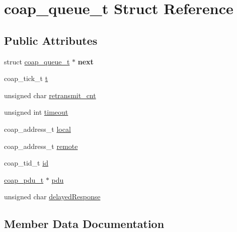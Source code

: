 \hypertarget{structcoap__queue__t}{}\section{coap\+\_\+queue\+\_\+t Struct Reference}
\label{structcoap__queue__t}
\subsection*{Public Attributes}
\begin{DoxyCompactItemize}
\item 
\hypertarget{structcoap__queue__t_a75428f649543d0779fce28c8538247d6}{}struct \hyperlink{structcoap__queue__t}{coap\+\_\+queue\+\_\+t} $\ast$ {\bfseries next}\label{structcoap__queue__t_a75428f649543d0779fce28c8538247d6}

\item 
coap\+\_\+tick\+\_\+t \hyperlink{structcoap__queue__t_ab5edd7b3b3ddd98d8356febbd4726e7c}{t}
\item 
unsigned char \hyperlink{structcoap__queue__t_aff24f5a43b3d2182535bc7bd2b5f5341}{retransmit\+\_\+cnt}
\item 
unsigned int \hyperlink{structcoap__queue__t_a4d8b47a02fea39b9a9fc0501f81cbaa2}{timeout}
\item 
coap\+\_\+address\+\_\+t \hyperlink{structcoap__queue__t_a19d2b774c366900ac9b34869cec54ec5}{local}
\item 
coap\+\_\+address\+\_\+t \hyperlink{structcoap__queue__t_a15ba08baabdadfe7ec9179e7dba5b5f2}{remote}
\item 
coap\+\_\+tid\+\_\+t \hyperlink{structcoap__queue__t_aeded9dd536f54ee47418575711e7dbac}{id}
\item 
\hyperlink{structcoap__pdu__t}{coap\+\_\+pdu\+\_\+t} $\ast$ \hyperlink{structcoap__queue__t_a2bc9a6e3ed0442653e53b92f5fa92954}{pdu}
\item 
unsigned char \hyperlink{structcoap__queue__t_a9ac0e0094dba5cfbd24f6509c5c3f665}{delayed\+Response}
\end{DoxyCompactItemize}


\subsection{Member Data Documentation}
\hypertarget{structcoap__queue__t_a9ac0e0094dba5cfbd24f6509c5c3f665}{}
